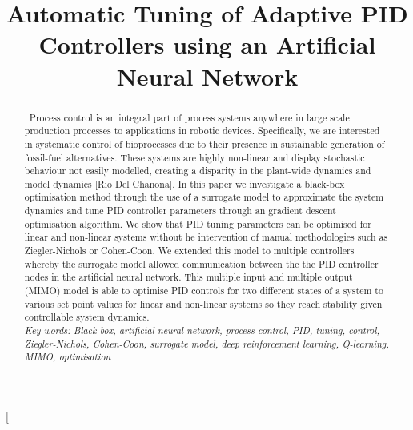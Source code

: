 \documentclass[conference]{IEEEtran}
\theoremstyle{definition}
\begin{document}
\title{Automatic Tuning of Adaptive PID Controllers using an Artificial Neural Network}


\author{
}




\pagestyle{plain}
\twocolumn[
    \begin{@twocolumnfalse}
    \pagestyle{plain}
    \maketitle
    \thispagestyle{plain}
    \end{@twocolumnfalse}
    \begin{abstract}
    ~{Process control is an integral part of process systems anywhere in large scale production processes to applications in robotic devices. Specifically, we are interested in systematic control of bioprocesses due to their presence in sustainable generation of fossil-fuel alternatives. These systems are highly non-linear and display stochastic behaviour not easily modelled, creating a disparity in the plant-wide dynamics and model dynamics [Rio Del Chanona]. In this paper we investigate a black-box optimisation method through the use of a surrogate model to approximate the system dynamics and tune PID controller parameters through an gradient descent optimisation algorithm. We show that PID tuning parameters can be optimised for linear and non-linear systems without he intervention of manual methodologies such as Ziegler-Nichols or Cohen-Coon. We extended this model to multiple controllers whereby the surrogate model allowed communication between the the PID controller nodes in the artificial neural network. This multiple input and multiple output (MIMO) model is able to optimise PID controls for two different states of a system to various set point values for linear and non-linear systems so they reach stability given controllable system dynamics. \\

    \noindent \textit{Key words: Black-box, artificial neural network, process control, PID, tuning, control, Ziegler-Nichols, Cohen-Coon, surrogate model, deep reinforcement learning, Q-learning, MIMO, optimisation}}
    \end{abstract}
\end{document}
